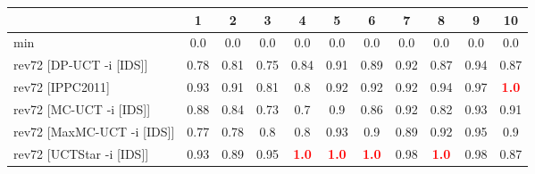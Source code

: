 \documentclass{article}
\begin{document}
\begin{tabular}{|l|r@{$\pm$}rr@{$\pm$}rr@{$\pm$}rr@{$\pm$}rr@{$\pm$}rr@{$\pm$}rr@{$\pm$}rr@{$\pm$}rr@{$\pm$}rr@{$\pm$}r|}
\hline

& \multicolumn{2}{c}{1}
& \multicolumn{2}{c}{2}
& \multicolumn{2}{c}{3}
& \multicolumn{2}{c}{4}
& \multicolumn{2}{c}{5}
& \multicolumn{2}{c}{6}
& \multicolumn{2}{c}{7}
& \multicolumn{2}{c}{8}
& \multicolumn{2}{c}{9}
& \multicolumn{2}{c|}{10}
\\
\hline
\hline
min
& \multicolumn{2}{c}{0.0}
& \multicolumn{2}{c}{0.0}
& \multicolumn{2}{c}{0.0}
& \multicolumn{2}{c}{0.0}
& \multicolumn{2}{c}{0.0}
& \multicolumn{2}{c}{0.0}
& \multicolumn{2}{c}{0.0}
& \multicolumn{2}{c}{0.0}
& \multicolumn{2}{c}{0.0}
& \multicolumn{2}{c|}{0.0}
\\
rev72 [DP-UCT -i [IDS]]
& \multicolumn{2}{c}{0.78}
& \multicolumn{2}{c}{0.81}
& \multicolumn{2}{c}{0.75}
& \multicolumn{2}{c}{0.84}
& \multicolumn{2}{c}{0.91}
& \multicolumn{2}{c}{0.89}
& \multicolumn{2}{c}{0.92}
& \multicolumn{2}{c}{0.87}
& \multicolumn{2}{c}{0.94}
& \multicolumn{2}{c|}{0.87}
\\
rev72 [IPPC2011]
& \multicolumn{2}{c}{0.93}
& \multicolumn{2}{c}{0.91}
& \multicolumn{2}{c}{0.81}
& \multicolumn{2}{c}{0.8}
& \multicolumn{2}{c}{0.92}
& \multicolumn{2}{c}{0.92}
& \multicolumn{2}{c}{0.92}
& \multicolumn{2}{c}{0.94}
& \multicolumn{2}{c}{0.97}
& \multicolumn{2}{c|}{\textbf{\textcolor{red}{1.0}}}
\\
rev72 [MC-UCT -i [IDS]]
& \multicolumn{2}{c}{0.88}
& \multicolumn{2}{c}{0.84}
& \multicolumn{2}{c}{0.73}
& \multicolumn{2}{c}{0.7}
& \multicolumn{2}{c}{0.9}
& \multicolumn{2}{c}{0.86}
& \multicolumn{2}{c}{0.92}
& \multicolumn{2}{c}{0.82}
& \multicolumn{2}{c}{0.93}
& \multicolumn{2}{c|}{0.91}
\\
rev72 [MaxMC-UCT -i [IDS]]
& \multicolumn{2}{c}{0.77}
& \multicolumn{2}{c}{0.78}
& \multicolumn{2}{c}{0.8}
& \multicolumn{2}{c}{0.8}
& \multicolumn{2}{c}{0.93}
& \multicolumn{2}{c}{0.9}
& \multicolumn{2}{c}{0.89}
& \multicolumn{2}{c}{0.92}
& \multicolumn{2}{c}{0.95}
& \multicolumn{2}{c|}{0.9}
\\
rev72 [UCTStar -i [IDS]]
& \multicolumn{2}{c}{0.93}
& \multicolumn{2}{c}{0.89}
& \multicolumn{2}{c}{0.95}
& \multicolumn{2}{c}{\textbf{\textcolor{red}{1.0}}}
& \multicolumn{2}{c}{\textbf{\textcolor{red}{1.0}}}
& \multicolumn{2}{c}{\textbf{\textcolor{red}{1.0}}}
& \multicolumn{2}{c}{0.98}
& \multicolumn{2}{c}{\textbf{\textcolor{red}{1.0}}}
& \multicolumn{2}{c}{0.98}
& \multicolumn{2}{c|}{0.87}
\\

\end{tabular}
\end{document}

